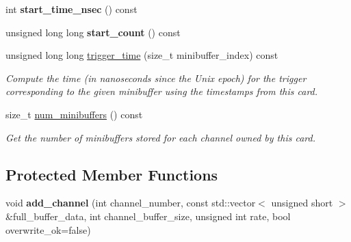 \begin{DoxyCompactItemize}
\item 
\hypertarget{classannie_1_1RawCard_aeea00e9f783264147b2727086579dac2}{
int {\bfseries start\_\-time\_\-nsec} () const }
\label{classannie_1_1RawCard_aeea00e9f783264147b2727086579dac2}

\item 
\hypertarget{classannie_1_1RawCard_ae1be1b743170e50a80448d4516f0c201}{
unsigned long long {\bfseries start\_\-count} () const }
\label{classannie_1_1RawCard_ae1be1b743170e50a80448d4516f0c201}

\item 
\hypertarget{classannie_1_1RawCard_a525abf75a5bcff78842437b91d4cd3b1}{
unsigned long long \hyperlink{classannie_1_1RawCard_a525abf75a5bcff78842437b91d4cd3b1}{trigger\_\-time} (size\_\-t minibuffer\_\-index) const }
\label{classannie_1_1RawCard_a525abf75a5bcff78842437b91d4cd3b1}

\begin{DoxyCompactList}\small\item\em Compute the time (in nanoseconds since the Unix epoch) for the trigger corresponding to the given minibuffer using the timestamps from this card. \item\end{DoxyCompactList}\item 
\hypertarget{classannie_1_1RawCard_a9deb5ad2584690c58f41d4e9a5ce030c}{
size\_\-t \hyperlink{classannie_1_1RawCard_a9deb5ad2584690c58f41d4e9a5ce030c}{num\_\-minibuffers} () const }
\label{classannie_1_1RawCard_a9deb5ad2584690c58f41d4e9a5ce030c}

\begin{DoxyCompactList}\small\item\em Get the number of minibuffers stored for each channel owned by this card. \item\end{DoxyCompactList}\end{DoxyCompactItemize}
\subsection*{Protected Member Functions}
\begin{DoxyCompactItemize}
\item 
\hypertarget{classannie_1_1RawCard_a9a63a10eabb68630f99a1c45dcfbcfe5}{
void {\bfseries add\_\-channel} (int channel\_\-number, const std::vector$<$ unsigned short $>$ \&full\_\-buffer\_\-data, int channel\_\-buffer\_\-size, unsigned int rate, bool overwrite\_\-ok=false)}
\label{classannie_1_1RawCard_a9a63a10eabb68630f99a1c45dcfbcfe5}

\end{DoxyCompactItemize}
